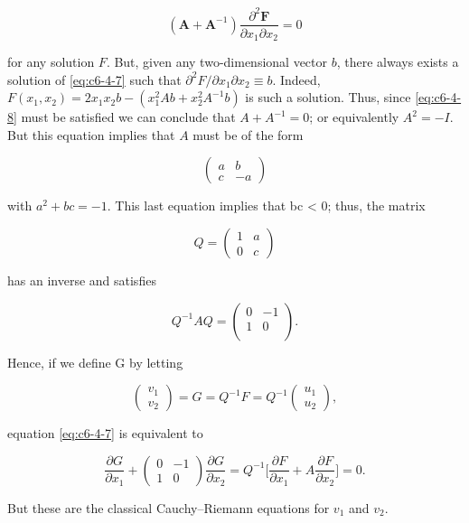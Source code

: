 \begin{equation}\label{eq:c6-4-8}
\left(\boldsymbol{A}+\boldsymbol{A}^{-1}\right)\frac{\partial^{2}\boldsymbol{F}}{\partial x_{1}\partial x_{2}}=0
\end{equation}

for any solution $F$. But, given any two-dimensional vector $b$, there always exists a solution of \eqref{eq:c6-4-7} such that $\partial^2 F / \partial x_1 \partial x_2 \equiv b$. Indeed, $F(x_1, x_2) = 2x_1 x_2 b - (x_1^2 A b + x_2^2 A^{-1} b)$ is such a solution. Thus, since \eqref{eq:c6-4-8} must be satisfied we can conclude that $A + A^{-1} = 0$; or equivalently $A^2 = -I$. But this equation implies that $A$ must be of the form

\[
\begin{pmatrix}a&b\\c&-a\end{pmatrix}
\]

with $a^{2} + bc = -1$. This last equation implies that bc < 0; thus, the matrix

\[
Q=\begin{pmatrix}1&a\\ 0&c\end{pmatrix}
\]

has an inverse and satisfies

\[
Q^{-1}A Q=\left(\begin{matrix}{0}&{-1}\\ {1}&{0}\\ \end{matrix}\right).
\]

Hence, if we define G by letting

\[
\begin{pmatrix}v_{1}\\ v_{2}\end{pmatrix}=G=Q^{-1}F=Q^{-1}\begin{pmatrix}u_{1}\\ u_{2}\end{pmatrix},
\]

equation \eqref{eq:c6-4-7} is equivalent to

\[
\frac{\partial G}{\partial x_{1}}+\begin{pmatrix}0&-1\\ 1&0\end{pmatrix}\frac{\partial G}{\partial x_{2}}=Q^{-1}\Big[\frac{\partial F}{\partial x_{1}}+A\frac{\partial F}{\partial x_{2}}\Big]=0.
\]

But these are the classical Cauchy--Riemann equations for $v_{1}$ and $v_{2}$.

